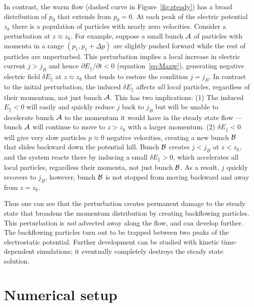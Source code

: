 In contrast, the warm flow (dashed curve in Figure~\ref{fig:steady}) has a broad
distribution of $p_0$ that extends from $p_0=0$. At each peak of the electric
potential $z_k$ there is a population of particles with nearly zero velocities.
Consider a perturbation at $z\approx z_k$. For example, suppose a small bunch
${\cal A}$ of particles with momenta in a range $(p_1,p_1+\Delta p)$ are slightly
pushed forward while the rest of particles are unperturbed. This perturbation
implies a local increase in electric current $j>j_B$ and hence $\partial
E_\parallel/\partial t<0$ (equation~\ref{eq:Maxw}), generating negative electric
field $\delta E_\parallel$ at $z\approx z_k$ that tends to restore the condition
$j=j_B$. In contrast to the initial perturbation, the induced $\delta
E_\parallel$ affects {\it all} local particles, regardless of their momentum,
not just bunch ${\cal A}$. This has two implications: (1) The induced $E_\parallel<0$
will easily and quickly reduce $j$ back to $j_B$ but will be unable to
decelerate bunch ${\cal A}$ to the momentum it would have in the steady state flow ---
bunch ${\cal A}$ will continue to move to $z>z_k$ with a larger momentum. (2) $\delta
E_\parallel<0$ will give very slow particles $p\approx 0$ negative velocities,
creating a new bunch ${\cal B}$ that slides backward down the potential hill. Bunch
${\cal B}$ creates $j<j_B$ at $z<z_k$, and the system reacts there by inducing a small
$\delta E_\parallel > 0$, which accelerates all local particles, regardless
their momenta, not just bunch ${\cal B}$. As a result, $j$ quickly recovers to $j_B$,
however, bunch ${\cal B}$ is not stopped from moving backward and away from $z=z_k$.

Thus one can see that the perturbation creates permanent damage to the steady
state that broadens the momentum distribution by creating backflowing particles.
This perturbation is {\it not} advected away along the flow, and can develop
further. The backflowing particles turn out to be trapped between two peaks of
the electrostatic potential. Further development can be studied with kinetic
time-dependent simulations; it eventually completely destroys the steady state
solution.



\section{Numerical setup}
\label{sec:pc-setup}


